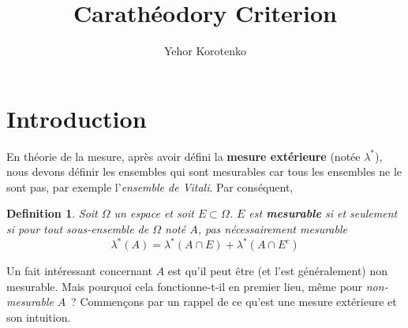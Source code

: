 \documentclass[a4paper]{article}
\author{Yehor Korotenko}
\title{Carathéodory Criterion}
\newtheorem{definition}{Definition}[section]
\begin{document}
\section{Introduction}%
En théorie de la mesure, après avoir défini la \textbf{mesure extérieure} (notée $\lambda^*$), nous devons définir les ensembles qui sont mesurables car tous les ensembles ne le sont pas, par exemple l'\textit{ensemble de Vitali}. Par conséquent,%
\begin{definition}
Soit $\Omega$ un espace et soit $E \subset \Omega$. $E$ est \textbf{mesurable} si et seulement si pour tout sous-ensemble de $\Omega$ noté $A$, pas nécessairement mesurable
\[
\lambda^*(A) = \lambda^*(A \cap E) + \lambda^*(A \cap E^c)
\] 
\end{definition}%
Un fait intéressant concernant $A$ est qu'il peut être (et l'est généralement) non mesurable. Mais pourquoi cela fonctionne-t-il en premier lieu, même pour \textit{non-mesurable} $A$ ? Commençons par un rappel de ce qu'est une mesure extérieure et son intuition.%
\end{document}
